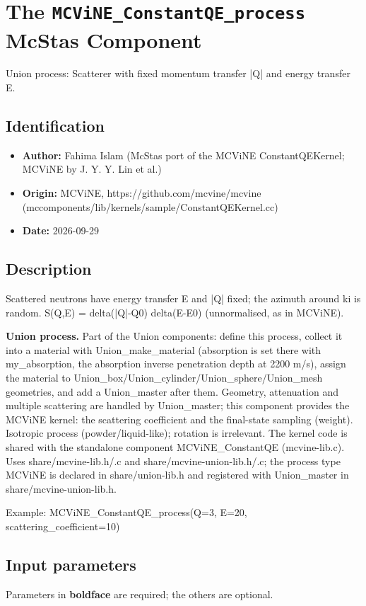 \section{The \texttt{MCViNE\_ConstantQE\_process} McStas Component}
Union process: Scatterer with fixed momentum transfer |Q| and energy transfer E.

\subsection*{Identification}
\begin{itemize}
  \item \textbf{Author:} Fahima Islam (McStas port of the MCViNE ConstantQEKernel; MCViNE by J. Y. Y. Lin et al.)
  \item \textbf{Origin:} MCViNE, https://github.com/mcvine/mcvine (mccomponents/lib/kernels/sample/ConstantQEKernel.cc)
  \item \textbf{Date:} 2026-09-29
\end{itemize}

\subsection*{Description}
Scattered neutrons have energy transfer E and |Q| fixed; the azimuth around ki is random. S(Q,E) = delta(|Q|-Q0) delta(E-E0) (unnormalised, as in MCViNE).

\textbf{Union process.} Part of the Union components: define this process, collect it into a material with Union\_make\_material (absorption is set there with my\_absorption, the absorption inverse penetration depth at 2200 m/s), assign the material to Union\_box/Union\_cylinder/Union\_sphere/Union\_mesh geometries, and add a Union\_master after them. Geometry, attenuation and multiple scattering are handled by Union\_master; this component provides the MCViNE kernel: the scattering coefficient and the final-state sampling (weight). Isotropic process (powder/liquid-like); rotation is irrelevant. The kernel code is shared with the standalone component MCViNE\_ConstantQE (mcvine-lib.c). Uses share/mcvine-lib.h/.c and share/mcvine-union-lib.h/.c; the process type MCViNE is declared in share/union-lib.h and registered with Union\_master in share/mcvine-union-lib.h.

Example: MCViNE\_ConstantQE\_process(Q=3, E=20, scattering\_coefficient=10)

\subsection*{Input parameters}
Parameters in \textbf{boldface} are required; the others are optional.


